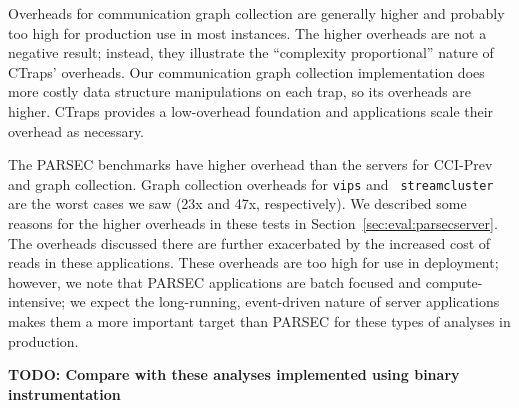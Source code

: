 \documentclass[preprint,9pt]{sigplanconf}
\newcommand{\addtodo}[1]{\textcolor{red}{[To do: #1]}}
\newcommand{\ctraps}{CTraps\xspace}
\newcommand{\ctrapsmm}{CTraps-NRR\xspace}
\begin{document}
Overheads for communication graph collection are generally higher and probably
too high for production use in most instances.  The higher overheads are not a
negative result; instead, they illustrate the ``complexity proportional''
nature of \ctraps' overheads.  Our communication graph collection
implementation does more costly data structure manipulations on each trap, so
its overheads are higher.  \ctraps provides a low-overhead foundation and
applications scale their overhead as necessary. 



The PARSEC benchmarks have higher overhead than the servers for CCI-Prev and
graph collection.  Graph collection overheads for {\tt vips} and {\tt
streamcluster} are the worst cases we saw (23x and 47x, respectively).  We
described some reasons for the higher overheads in these tests in
Section~\ref{sec:eval:parsecserver}.  The overheads discussed there are further
exacerbated by the increased cost of reads in these applications.  These
overheads are too high for use in deployment;  however, we note that PARSEC
applications are batch focused and compute-intensive; we expect the
long-running, event-driven nature of server applications makes them a more
important target than PARSEC for these types of analyses in production.  

{\bf TODO: Compare with these analyses implemented using binary instrumentation}



\end{document}
